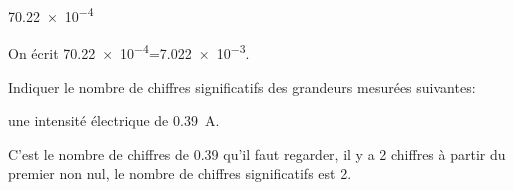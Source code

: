 \begin{enonce}
\num{70.22e-4}
\end{enonce}


\begin{corrige}
On écrit \num{70.22e-4}=\num{7.022e-3}.
\end{corrige}



\finEntrainement





\hauteurLargeurCadreReponse		{6mm}{1.5cm}
\initialisationEntrainement

Indiquer le nombre de chiffres significatifs des grandeurs mesurées suivantes:


\debutEntrainement



\begin{enonce}
une intensité électrique de \SI{.39}{\ampere}.
\end{enonce}


\begin{corrige}
C'est le nombre de chiffres de \num{.39} qu'il faut regarder, il y a 2 chiffres à partir du premier non nul, le nombre de chiffres significatifs est {2}.
\end{corrige}

